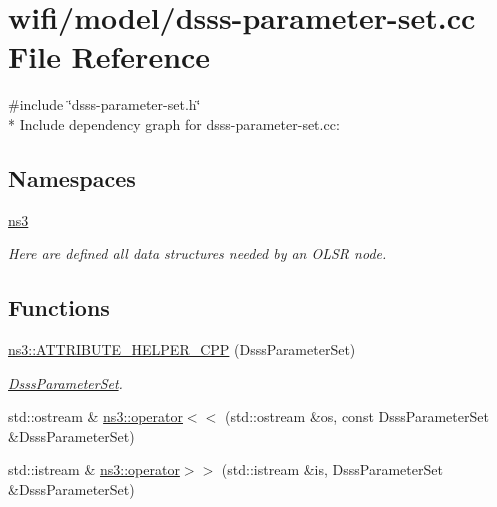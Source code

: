 \hypertarget{dsss-parameter-set_8cc}{}\section{wifi/model/dsss-\/parameter-\/set.cc File Reference}
\label{dsss-parameter-set_8cc}
{\ttfamily \#include \char`\"{}dsss-\/parameter-\/set.\+h\char`\"{}}\\*
Include dependency graph for dsss-\/parameter-\/set.cc\+:
\subsection*{Namespaces}
\begin{DoxyCompactItemize}
\item 
 \hyperlink{namespacens3}{ns3}
\begin{DoxyCompactList}\small\item\em Here are defined all data structures needed by an O\+L\+SR node. \end{DoxyCompactList}\end{DoxyCompactItemize}
\subsection*{Functions}
\begin{DoxyCompactItemize}
\item 
\hyperlink{namespacens3_ad5ab624c35d3dee048648e000aa0f2d6}{ns3\+::\+A\+T\+T\+R\+I\+B\+U\+T\+E\+\_\+\+H\+E\+L\+P\+E\+R\+\_\+\+C\+PP} (Dsss\+Parameter\+Set)
\begin{DoxyCompactList}\small\item\em \hyperlink{classns3_1_1DsssParameterSet}{Dsss\+Parameter\+Set}. \end{DoxyCompactList}\item 
std\+::ostream \& \hyperlink{namespacens3_a21490531609fc9a45243c001d52d1d1c}{ns3\+::operator$<$$<$} (std\+::ostream \&os, const Dsss\+Parameter\+Set \&Dsss\+Parameter\+Set)
\item 
std\+::istream \& \hyperlink{namespacens3_a4c973e6253b36ca194b9c6fbb8416f24}{ns3\+::operator$>$$>$} (std\+::istream \&is, Dsss\+Parameter\+Set \&Dsss\+Parameter\+Set)
\end{DoxyCompactItemize}
